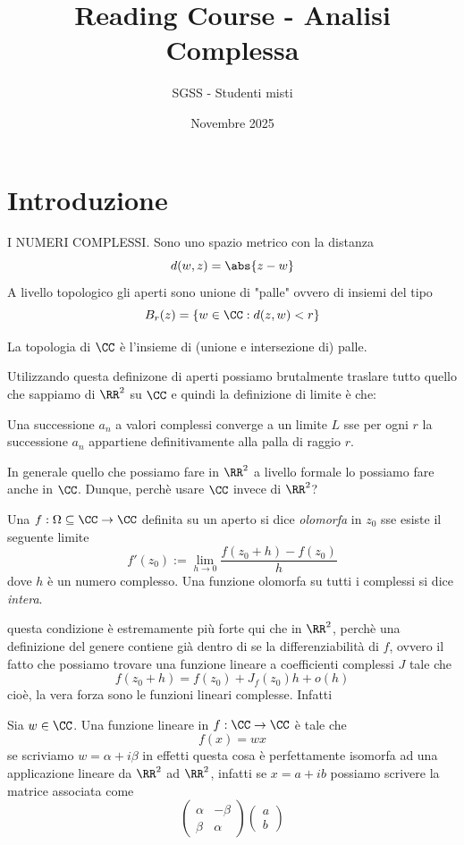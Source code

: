 \documentclass[11pt]{scrartcl}
\begin{document}
	\title{Reading Course - Analisi Complessa}
	\subtitle{SGSS - Studenti misti}
	\date{Novembre 2025}
	
	
	\maketitle
	
	\tableofcontents
	
	\newpage
	
	\section{Introduzione}
	I NUMERI COMPLESSI. Sono uno spazio metrico con la distanza 
	$$d(w,z)=\abs{z-w}$$
	A livello topologico gli aperti sono unione di "palle" ovvero di insiemi del tipo
	$$B_r(z)=\left\{w\in \CC:d(z,w)<r\right\}$$
	\begin{definition}[Topologia di $\CC$]
		La topologia di $\CC$ è l'insieme di (unione e intersezione di) palle.
	\end{definition}
	Utilizzando questa definizone di aperti possiamo brutalmente traslare tutto quello che sappiamo di $\RR^2$ su $\CC$ e quindi la definizione di limite è che:
	\begin{definition}
		Una successione $a_n$ a valori complessi converge a un limite $L$ sse per ogni $r$ la successione $a_n$ appartiene definitivamente alla palla di raggio $r$.
	\end{definition}
	In generale quello che possiamo fare in $\RR^2$ a livello formale lo possiamo fare anche in $\CC$. Dunque, perchè usare $\CC$ invece di $\RR^2$?
	\begin{definition}
		Una $f:\Omega\subseteq \CC \to \CC$ definita su un aperto si dice \textit{olomorfa} in $z_0$ sse esiste il seguente limite
		$$f'(z_0):=\lim_{h\to 0}\frac{f(z_0+h)-f(z_0)}{h}$$
		dove $h$ è un numero complesso. Una funzione olomorfa su tutti i complessi si dice \textit{intera}.
	\end{definition}
	questa condizione è estremamente più forte qui che in $\RR^2$, perchè una definizione del genere contiene già dentro di se la differenziabilità di $f$, ovvero il fatto che possiamo trovare una funzione lineare a coefficienti complessi $J$ tale che
	$$f(z_0+h)=f(z_0)+J_f(z_0)h+o(h)$$
	cioè, la vera forza sono le funzioni lineari complesse. Infatti 
	\begin{definition}
		Sia $w\in\CC$. Una funzione lineare in $f:\CC\to \CC$ è tale che
		$$f(x)=wx$$
		se scriviamo $w=\alpha+i\beta$ in effetti questa cosa è perfettamente isomorfa ad una applicazione lineare da $\RR^2$ ad $\RR^2$, infatti se $x=a+ib$ possiamo scrivere la matrice associata come 
		$$\begin{pmatrix}
			\alpha & -\beta \\
			\beta & \alpha
		\end{pmatrix}\begin{pmatrix}
		a \\
		b
		\end{pmatrix}$$
	\end{definition}
\end{document}
